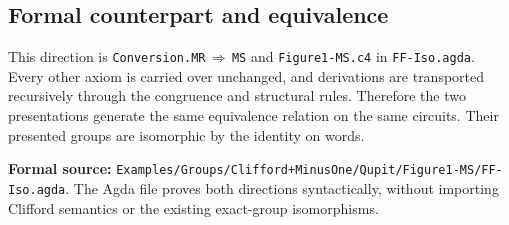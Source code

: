 \documentclass[11pt,a4paper]{article}
\begin{document}
\subsection*{Formal counterpart and equivalence}
This direction is \texttt{Conversion.MR}\,$\Rightarrow$\,\texttt{MS} and
\texttt{Figure1-MS.c4} in \texttt{FF-Iso.agda}.
Every other axiom is carried over unchanged, and derivations are transported
recursively through the congruence and structural rules. Therefore the two
presentations generate the same equivalence relation on the same circuits.
Their presented groups are isomorphic by the identity on words.

\smallskip
\small
\textbf{Formal source:}
\nolinkurl{Examples/Groups/Clifford+MinusOne/Qupit/Figure1-MS/FF-Iso.agda}.
The Agda file proves both directions syntactically, without importing Clifford
semantics or the existing exact-group isomorphisms.
\end{document}
